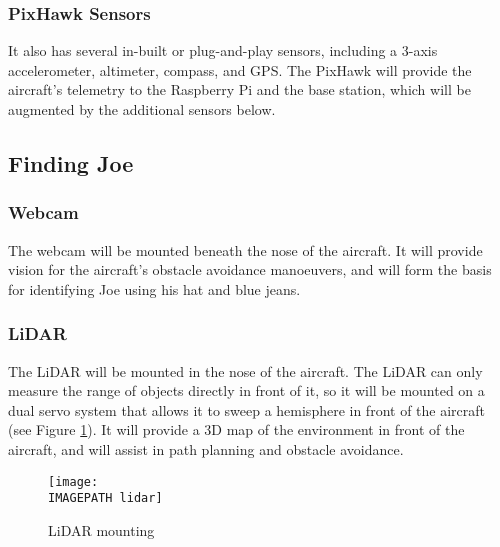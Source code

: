 \subsubsection*{PixHawk Sensors}
It also has several in-built or plug-and-play sensors, including a 3-axis accelerometer, altimeter, compass, and GPS. The PixHawk will provide the aircraft's telemetry to the Raspberry Pi and the base station, which will be augmented by the additional sensors below.

\subsection{Finding Joe}
\subsubsection*{Webcam}
The webcam will be mounted beneath the nose of the aircraft. It will provide vision for the aircraft's obstacle avoidance manoeuvers, and will form the basis for identifying Joe using his hat and blue jeans.

\subsubsection*{LiDAR}
The LiDAR will be mounted in the nose of the aircraft. The LiDAR can only measure the range of objects directly in front of it, so it will be mounted on a dual servo system that allows it to sweep a hemisphere in front of the aircraft (see Figure \ref*{fig:lidar}). It will provide a 3D map of the environment in front of the aircraft, and will assist in path planning and obstacle avoidance.

\begin{figure}[!ht]
	\centering
	\texttt{[image: \\IMAGEPATH lidar]}
	\caption{LiDAR mounting}
	\label{fig:lidar}
\end{figure}